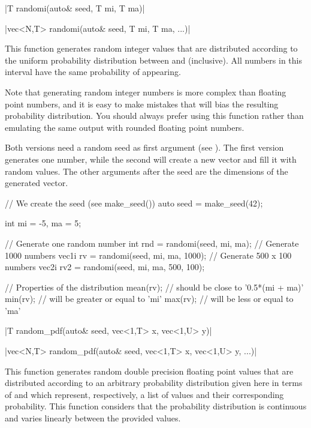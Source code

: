 \funcitem \cppinline|T randomi(auto& seed, T mi, T ma)| 

\cppinline|vec<N,T> randomi(auto& seed, T mi, T ma, ...)|

This function generates random integer values that are distributed according to the uniform probability distribution between  and  (inclusive). All numbers in this interval have the same probability of appearing.

Note that generating random integer numbers is more complex than floating point numbers, and it is easy to make mistakes that will bias the resulting probability distribution. You should always prefer using this function rather than emulating the same output with rounded floating point numbers.

Both versions need a random seed as first argument (see ). The first version generates one number, while the second will create a new vector and fill it with random values. The other arguments after the seed are the dimensions of the generated vector.

\begin{example}
\begin{cppcode}
// We create the seed (see make_seed())
auto seed = make_seed(42);

int mi = -5, ma = 5;

// Generate one random number
int rnd = randomi(seed, mi, ma);
// Generate 1000 numbers
vec1i rv = randomi(seed, mi, ma, 1000);
// Generate 500 x 100 numbers
vec2i rv2 = randomi(seed, mi, ma, 500, 100);

// Properties of the distribution
mean(rv); // should be close to '0.5*(mi + ma)'
min(rv); // will be greater or equal to 'mi'
max(rv); // will be less or equal to 'ma'
\end{cppcode}
\end{example}

\funcitem \cppinline|T random_pdf(auto& seed, vec<1,T> x, vec<1,U> y)| 

\cppinline|vec<N,T> random_pdf(auto& seed, vec<1,T> x, vec<1,U> y, ...)|

This function generates random double precision floating point values that are distributed according to an arbitrary probability distribution given here in terms of  and  which represent, respectively, a list of values and their corresponding probability. This function considers that the probability distribution is continuous and varies linearly between the provided values.

